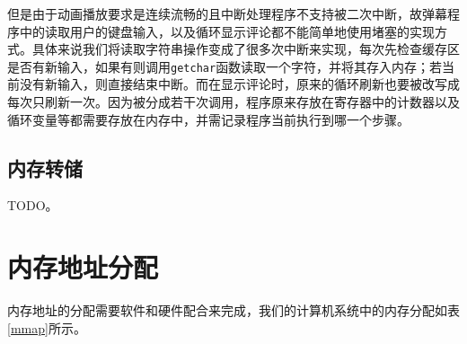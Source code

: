 \documentclass[11pt,utf8]{report}
\begin{document}
但是由于动画播放要求是连续流畅的且中断处理程序不支持被二次中断，故弹幕程序中的读取用户的键盘输入，以及循环显示评论都不能简单地使用堵塞的实现方式。具体来说我们将读取字符串操作变成了很多次中断来实现，每次先检查缓存区是否有新输入，如果有则调用\texttt{getchar}函数读取一个字符，并将其存入内存；若当前没有新输入，则直接结束中断。而在显示评论时，原来的循环刷新也要被改写成每次只刷新一次。因为被分成若干次调用，程序原来存放在寄存器中的计数器以及循环变量等都需要存放在内存中，并需记录程序当前执行到哪一个步骤。


\subsection{内存转储}
	\par TODO。

\section{内存地址分配}

内存地址的分配需要软件和硬件配合来完成，我们的计算机系统中的内存分配如表\ref{mmap}所示。
\end{document}
